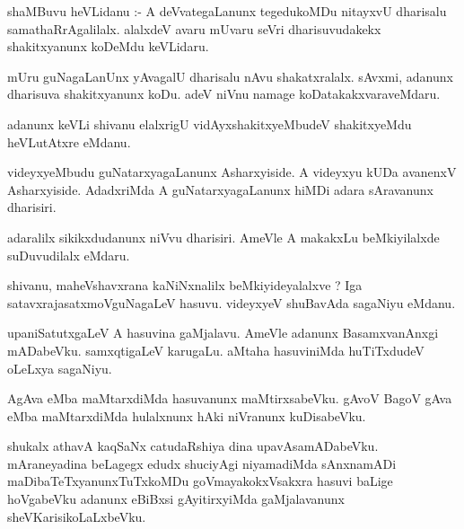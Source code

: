 \documentclass{article}
\begin{document}
\begin{mn}
shaMBuvu  heVLidanu :- A  deVvategaLanunx  tegedukoMDu  nitayxvU  dharisalu  samathaRrAgalilalx.  alalxdeV  
avaru  mUvaru  seVri  dharisuvudakekx  shakitxyanunx  koDeMdu  keVLidaru.
\end{mn}

\begin{mn}
mUru  guNagaLanUnx  yAvagalU  dharisalu  nAvu  shakatxralalx.  sAvxmi,  adanunx  dharisuva  
shakitxyanunx  koDu.  adeV  niVnu  namage  koDatakakxvaraveMdaru.
\end{mn}

\begin{mn}
adanunx  keVLi  shivanu  elalxrigU  vidAyxshakitxyeMbudeV  shakitxyeMdu  heVLutAtxre  eMdanu.
\end{mn}

\begin{mn}
videyxyeMbudu  guNatarxyagaLanunx  Asharxyiside.  A  videyxyu kUDa  avanenxV  Asharxyiside.  
AdadxriMda  A  guNatarxyagaLanunx  hiMDi  adara  sAravanunx  dharisiri.
\end{mn}

\begin{mn}
adaralilx  sikikxdudanunx  niVvu  dharisiri.  AmeVle  A  makakxLu  beMkiyilalxde  suDuvudilalx  eMdaru.
\end{mn}

\begin{mn}
shivanu,  maheVshavxrana  kaNiNxnalilx  beMkiyideyalalxve ?  Iga  satavxrajasatxmoVguNagaLeV  hasuvu.  
videyxyeV  shuBavAda  sagaNiyu  eMdanu.
\end{mn}

\begin{mn}
upaniSatutxgaLeV  A  hasuvina  gaMjalavu.  AmeVle  adanunx  BasamxvanAnxgi  mADabeVku.  samxqtigaLeV  
karugaLu.  aMtaha  hasuviniMda  huTiTxdudeV  oLeLxya  sagaNiyu.
\end{mn}

\begin{mn}
AgAva  eMba  maMtarxdiMda  hasuvanunx  maMtirxsabeVku.  gAvoV BagoV  gAva  eMba  maMtarxdiMda  
hulalxnunx  hAki  niVranunx  kuDisabeVku.
\end{mn}

\begin{mn}
shukalx  athavA  kaqSaNx catudaRshiya  dina  upavAsamADabeVku.  mAraneyadina  beLagegx  edudx  
shuciyAgi  niyamadiMda  sAnxnamADi  maDibaTeTxyanunxTuTxkoMDu  goVmayakokxVsakxra  hasuvi  baLige  
hoVgabeVku  adanunx  eBiBxsi  gAyitirxyiMda  gaMjalavanunx  sheVKarisikoLaLxbeVku.
\end{mn}
\end{document}
